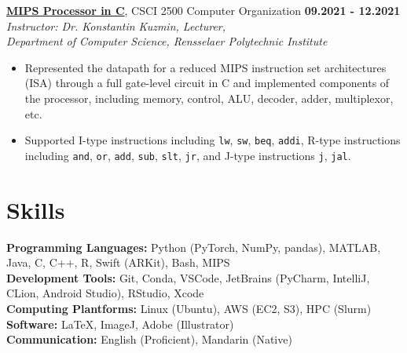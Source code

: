 \documentclass[letterpaper, 10pt]{article}
\newcommand{\subsectionvspace}{\vspace{6pt}}
\begin{document}
    \subsectionvspace

    \textbf{\href{https://github.com/tianrui-qi/MIPS-Processor}{MIPS Processor in C}},
    CSCI 2500 Computer Organization \hfill \textbf{09.2021 - 12.2021} \\
    \textit{
        Instructor: Dr. Konstantin Kuzmin,
        Lecturer, \\
        Department of Computer Science,
        Rensselaer Polytechnic Institute
    }
    \begin{itemize}
        \item Represented the datapath for a reduced MIPS instruction set architectures (ISA) through a full gate-level circuit in C and implemented components of the processor, including memory, control, ALU, decoder, adder, multiplexor, etc.
        \item Supported I-type instructions including \verb|lw|, \verb|sw|, \verb|beq|, \verb|addi|, R-type instructions including \verb|and|, \verb|or|, \verb|add|, \verb|sub|, \verb|slt|, \verb|jr|, and J-type instructions \verb|j|, \verb|jal|.
    \end{itemize}


\section{Skills}


    \textbf{Programming Languages:} Python (PyTorch, NumPy, pandas), MATLAB, Java, C, C++, R, Swift (ARKit), Bash, MIPS
    \\
    \textbf{Development Tools:} Git, Conda, VSCode, JetBrains (PyCharm, IntelliJ, CLion, Android Studio), RStudio, Xcode
    \\
    \textbf{Computing Plantforms:} Linux (Ubuntu), AWS (EC2, S3), HPC (Slurm)
    \\
    \textbf{Software:} LaTeX, ImageJ, Adobe (Illustrator)
    \\
    \textbf{Communication:} English (Proficient), Mandarin (Native)
\end{document}
